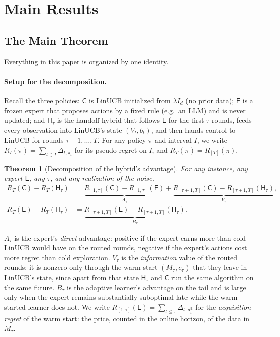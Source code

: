\documentclass{article}
\newtheorem{theorem}{Theorem}
\theoremstyle{definition}
\theoremstyle{remark}
\theoremstyle{remark}
\newcommand{\Cold}{\mathsf{C}}
\newcommand{\Exp}{\mathsf{E}}
\newcommand{\Hyb}{\mathsf{H}}
\begin{document}
\section{Main Results}
\label{sec:main-results}

\subsection{The Main Theorem}
\label{sec:catalog}

Everything in this paper is organized by one identity.

\paragraph{Setup for the decomposition.}
Recall the three policies: $\Cold$ is LinUCB initialized from $\lambda I_d$
(no prior data); $\Exp$ is a frozen expert that proposes actions by a fixed
rule (e.g.\ an LLM) and is never updated; and $\Hyb_\tau$ is the handoff
hybrid that follows $\Exp$ for the first $\tau$ rounds, feeds every
observation into LinUCB's state $(V_t,b_t)$, and then hands control to LinUCB
for rounds $\tau{+}1,\dots,T$. For any policy $\pi$ and interval $I$, we
write $R_I(\pi)=\sum_{t\in I}\Delta_{t,\pi_t}$ for its pseudo-regret on $I$,
and $R_T(\pi)=R_{[T]}(\pi)$.

\begin{theorem}[Decomposition of the hybrid's advantage]
\label{prop:decomp}
For any instance, any expert $\Exp$, any $\tau$, and any realization of the
noise,
\begin{align*}
R_T(\Cold)-R_T(\Hyb_\tau)
&=\underbrace{R_{[1,\tau]}(\Cold)-R_{[1,\tau]}(\Exp)}_{A_\tau}
 +\underbrace{R_{[\tau+1,T]}(\Cold)-R_{[\tau+1,T]}(\Hyb_\tau)}_{V_\tau},\\
R_T(\Exp)-R_T(\Hyb_\tau)
&=\underbrace{R_{[\tau+1,T]}(\Exp)-R_{[\tau+1,T]}(\Hyb_\tau)}_{B_\tau}.
\end{align*}
\end{theorem}

$A_\tau$ is the expert's \emph{direct} advantage: positive if the expert earns
more than cold LinUCB would have on the routed rounds, negative if the expert's
actions cost more regret than cold exploration. $V_\tau$ is the
\emph{information} value of the routed rounds: it is nonzero only through the
warm start $(M_\tau,c_\tau)$ that they leave in LinUCB's state, since apart
from that state $\Hyb_\tau$ and $\Cold$ run the same algorithm on the same
future. $B_\tau$ is the adaptive learner's advantage on the tail and is large
only when the expert remains substantially suboptimal late while the
warm-started learner does not. We write $R_{[1,\tau]}(\Exp)=\sum_{t\le\tau}\Delta_{t,a_t^{\Exp}}$
for the \emph{acquisition regret} of the warm start: the price, counted in the
online horizon, of the data in $M_\tau$.
\end{document}
